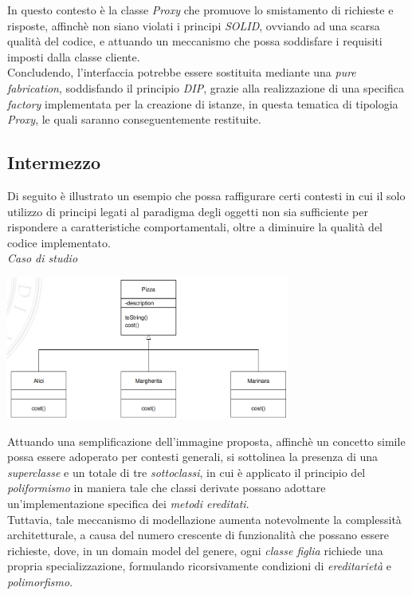 \documentclass{article}
\begin{document}
In questo contesto è la classe \textit{Proxy} che promuove lo smistamento di richieste e risposte, affinchè non siano violati i principi \textit{SOLID}, ovviando ad una scarsa qualità del codice, e attuando un meccanismo che possa soddisfare i requisiti imposti dalla classe cliente.\vspace*{14pt}\\
Concludendo, l'interfaccia potrebbe essere sostituita mediante una \textit{pure fabrication}, soddisfando il principio \textit{DIP}, grazie alla realizzazione di una specifica \textit{factory} implementata per la creazione di istanze, in questa tematica di tipologia \textit{Proxy}, le quali saranno conseguentemente restituite.

\subsection*{Intermezzo}
\large
Di seguito è illustrato un esempio che possa raffigurare certi contesti in cui il solo utilizzo di principi legati al paradigma degli oggetti non sia sufficiente per rispondere a caratteristiche comportamentali, oltre a diminuire la qualità del codice implementato.\vspace*{14pt}\\
\textit{Caso di studio}\\
\begin{center}
    \includegraphics[width=0.7\textwidth]{foto 2.png}
\end{center}
Attuando una semplificazione dell'immagine proposta, affinchè un concetto simile possa essere adoperato per contesti generali, si sottolinea la presenza di una \textit{superclasse} e un totale di tre \textit{sottoclassi}, in cui è applicato il principio del \textit{poliformismo} in maniera tale che classi derivate possano adottare un'implementazione specifica dei \textit{metodi ereditati}.\\
Tuttavia, tale meccanismo di modellazione aumenta notevolmente la complessità architetturale, a causa del numero crescente di funzionalità che possano essere richieste, dove, in un domain model del genere, ogni \textit{classe figlia} richiede una propria specializzazione, formulando ricorsivamente condizioni di \textit{ereditarietà} e \textit{polimorfismo}.\vspace*{3pt}  
\end{document}
